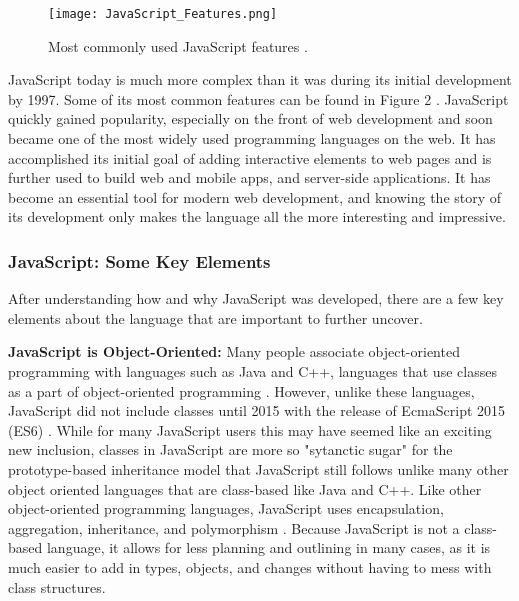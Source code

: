 \documentclass{article}
\theoremstyle{theorem}
\theoremstyle{definition}
\theoremstyle{remark}
\begin{document}
\begin{figure}
\centering
\texttt{[image: JavaScript\_Features.png]}
\caption{\label{fig:JavaScript_Features}Most commonly used JavaScript features \cite{1}.}
\end{figure}

JavaScript today is much more complex than it was during its initial development by 1997. Some of its most common features can be found in Figure 2 \cite{1}. JavaScript quickly gained popularity, especially on the front of web development and soon became one of the most widely used programming languages on the web. It has accomplished its initial goal of adding interactive elements to web pages and is further used to build web and mobile apps, and server-side applications. It has become an essential tool for modern web development, and knowing the story of its development only makes the language all the more interesting and impressive.

\subsubsection{JavaScript: Some Key Elements}

After understanding how and why JavaScript was developed, there are a few key elements about the language that are important to further uncover.

\textbf{JavaScript is Object-Oriented:}
Many people associate object-oriented programming with languages such as Java and C++, languages that use classes as a part of object-oriented programming \cite{7}. However, unlike these languages, JavaScript did not include classes until 2015 with the release of EcmaScript 2015 (ES6) \cite{17}. While for many JavaScript users this may have seemed like an exciting new inclusion, classes in JavaScript are more so "sytanctic sugar" for the prototype-based inheritance model that JavaScript still follows \cite{17} unlike many other object oriented languages that are class-based like Java and C++. Like other object-oriented programming languages, JavaScript uses encapsulation, aggregation, inheritance, and polymorphism \cite{7}. Because JavaScript is not a class-based language, it allows for less planning and outlining in many cases, as it is much easier to add in types, objects, and changes without having to mess with class structures.
\end{document}
